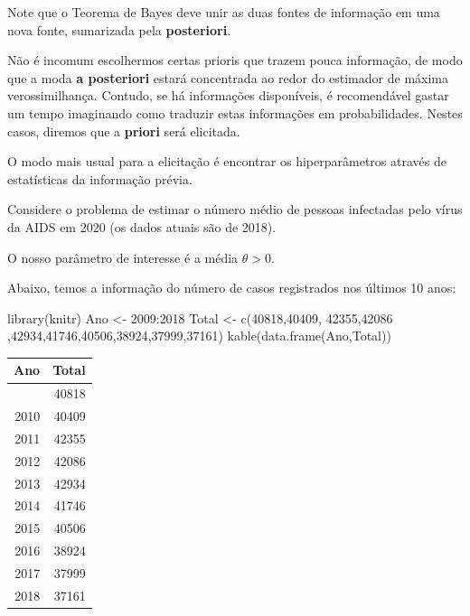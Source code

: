 \documentclass[
  letterpaper,
  DIV=11,
  numbers=noendperiod]{scrreprt}
\newenvironment{Shaded}{\begin{snugshade}}{\end{snugshade}}
\newcommand{\DecValTok}[1]{\textcolor[rgb]{0.68,0.00,0.00}{#1}}
\newcommand{\FunctionTok}[1]{\textcolor[rgb]{0.28,0.35,0.67}{#1}}
\newcommand{\NormalTok}[1]{\textcolor[rgb]{0.00,0.23,0.31}{#1}}
\newcommand{\OtherTok}[1]{\textcolor[rgb]{0.00,0.23,0.31}{#1}}
\newcommand{\SpecialCharTok}[1]{\textcolor[rgb]{0.37,0.37,0.37}{#1}}
\theoremstyle{definition}
\theoremstyle{definition}
\theoremstyle{remark}
\begin{document}
Note que o Teorema de Bayes deve unir as duas fontes de informação em
uma nova fonte, sumarizada pela \textbf{posteriori}.

Não é incomum escolhermos certas prioris que trazem pouca informação, de
modo que a moda \textbf{a posteriori} estará concentrada ao redor do
estimador de máxima verossimilhança. Contudo, se há informações
disponíveis, é recomendável gastar um tempo imaginando como traduzir
estas informações em probabilidades. Nestes casos, diremos que a
\textbf{priori} será elicitada.

O modo mais usual para a elicitação é encontrar os hiperparâmetros
através de estatísticas da informação prévia.

Considere o problema de estimar o número médio de pessoas infectadas
pelo vírus da AIDS em 2020 (os dados atuais são de 2018).

O nosso parâmetro de interesse é a média \(\theta>0\).

Abaixo, temos a informação do número de casos registrados nos últimos 10
anos:

\begin{Shaded}
\begin{Highlighting}[]
\FunctionTok{library}\NormalTok{(knitr)}
\NormalTok{Ano }\OtherTok{\textless{}{-}} \DecValTok{2009}\SpecialCharTok{:}\DecValTok{2018}
\NormalTok{Total }\OtherTok{\textless{}{-}}    \FunctionTok{c}\NormalTok{(}\DecValTok{40818}\NormalTok{,}\DecValTok{40409}\NormalTok{, }\DecValTok{42355}\NormalTok{,}\DecValTok{42086}\NormalTok{ ,}\DecValTok{42934}\NormalTok{,}\DecValTok{41746}\NormalTok{,}\DecValTok{40506}\NormalTok{,}\DecValTok{38924}\NormalTok{,}\DecValTok{37999}\NormalTok{,}\DecValTok{37161}\NormalTok{)}
\FunctionTok{kable}\NormalTok{(}\FunctionTok{data.frame}\NormalTok{(Ano,Total))}
\end{Highlighting}
\end{Shaded}

\begin{longtable}[]{@{}rr@{}}
\toprule\noalign{}
Ano & Total \\
\midrule\noalign{}
\endhead
\bottomrule\noalign{}
\endlastfoot
2009 & 40818 \\
2010 & 40409 \\
2011 & 42355 \\
2012 & 42086 \\
2013 & 42934 \\
2014 & 41746 \\
2015 & 40506 \\
2016 & 38924 \\
2017 & 37999 \\
2018 & 37161 \\
\end{longtable}
\end{document}
